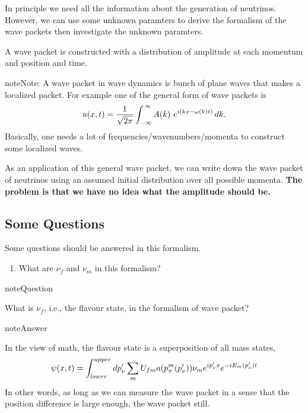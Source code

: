 \documentclass[letterpaper,12pt,english]{sphinxmanual}
\begin{document}
In principle we need all the information about the generation of neutrinos. However, we can use some unknown paramters to derive the formalism of the wave packets then investigate the unknown paramters.

A wave packet is constructed with a distribution of amplitude at each momentum and position and time.

\begin{notice}{note}{Note:}
A wave packet in wave dynamics is bunch of plane waves that makes a localized packet. For example one of the general form of wave packets is
\begin{gather}
\begin{split}u(x,t) = \frac{1}{\sqrt{2\pi}} \int^{\,\infty}_{-\infty} A(k) ~ e^{i(kx-\omega(k)t)} \,dk .\end{split}\notag
\end{gather}
Basically, one needs a lot of frequencies/wavenumbers/momenta to construct some localized waves.
\end{notice}

As an application of this general wave packet, we can write down the wave packet of neutrinos using an assumed initial distribution over all possible momenta. \textbf{The problem is that we have no idea what the amplitude should be.}


\subsection{Some Questions}
\label{propagation:some-questions}
Some questions should be answered in this formalism.
\begin{enumerate}
\item {} 
What are \(\nu_f\) and \(\nu_m\) in this formalism?

\end{enumerate}

\begin{notice}{note}{Question}

What is \(\nu_f\), i.e., the flavour state, in the formalism of wave packet?
\end{notice}

\begin{notice}{note}{Answer}

In the view of math, the flavour state is a superposition of all mass states,
\begin{gather}
\begin{split}\psi(x,t) = \int_{lower}^{upper} dp_\nu' \sum_m U_{fm} a(p_\pi^m(p_\nu')) \nu_m e^{ip_\nu'x} e^{-i E_m(p_\nu')t}\end{split}\notag
\end{gather}
In other words, as long as we can measure the wave packet in a sense that the position difference is large enough, the wave packet still.
\end{notice}
\end{document}
